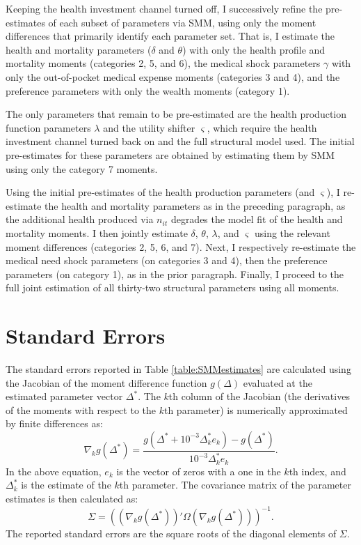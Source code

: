 \documentclass[12pt,pdftex,letterpaper]{article}
\newcommand{\Invst}{n}
\newcommand{\MedShkParam}{\gamma}
\newcommand{\LifeUtility}{\varsigma}
\newcommand{\HealthParam}{\delta}
\newcommand{\MortParam}{\theta}
\newcommand{\HealthProdParamAlt}{\lambda}
\begin{document}
Keeping the health investment channel turned off, I successively refine the pre-estimates of each subset of parameters via SMM, using only the moment differences that primarily identify each parameter set.  That is, I estimate the health and mortality parameters ($\HealthParam$ and $\MortParam$) with only the health profile and mortality moments (categories 2, 5, and 6), the medical shock parameters $\MedShkParam$ with only the out-of-pocket medical expense moments (categories 3 and 4), and the preference parameters with only the wealth moments (category 1).

The only parameters that remain to be pre-estimated are the health production function parameters $\HealthProdParamAlt$ and the utility shifter $\LifeUtility$, which require the health investment channel turned back on and the full structural model used.  The initial pre-estimates for these parameters are obtained by estimating them by SMM using only the category 7 moments.  

Using the initial pre-estimates of the health production parameters (and $\LifeUtility$), I re-estimate the health and mortality parameters as in the preceding paragraph, as the additional health produced via $\Invst_{it}$ degrades the model fit of the health and mortality moments.  I then jointly estimate $\HealthParam$, $\MortParam$, $\HealthProdParamAlt$, and $\LifeUtility$ using the relevant moment differences (categories 2, 5, 6, and 7).  Next, I respectively re-estimate the medical need shock parameters (on categories 3 and 4), then the preference parameters (on category 1), as in the prior paragraph.  Finally, I proceed to the full joint estimation of all thirty-two structural parameters using all moments.


\section{Standard Errors}
\label{app:StdErrors}

The standard errors reported in Table \ref{table:SMMestimates} are calculated using the Jacobian of the moment difference function $g(\Delta)$ evaluated at the estimated parameter vector $\Delta^*$.  The $k$th column of the Jacobian (the derivatives of the moments with respect to the $k$th parameter) is numerically approximated by finite differences as:
\begin{equation}
\nabla_k g(\Delta^*) = \frac{g(\Delta^* + 10^{-3} \Delta^*_k e_k) - g(\Delta^*)}{10^{-3} \Delta^*_k e_k}.
\end{equation}
In the above equation, $e_k$ is the vector of zeros with a one in the $k$th index, and $\Delta^*_k$ is the estimate of the $k$th parameter.  The covariance matrix of the parameter estimates is then calculated as:
\begin{equation}
\Sigma = \left( (\nabla_k g(\Delta^*))' \Omega (\nabla_k g(\Delta^*)) \right)^{-1}.
\end{equation}
The reported standard errors are the square roots of the diagonal elements of $\Sigma$.
\end{document}
